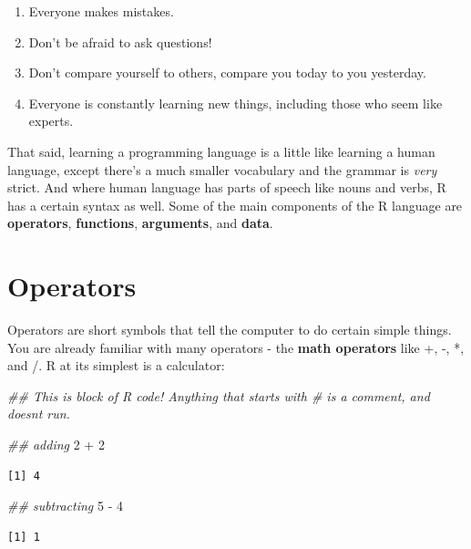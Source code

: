\documentclass[
  letterpaper,
  DIV=11,
  numbers=noendperiod]{scrreprt}
\newenvironment{Shaded}{\begin{snugshade}}{\end{snugshade}}
\newcommand{\DecValTok}[1]{\textcolor[rgb]{0.68,0.00,0.00}{#1}}
\newcommand{\DocumentationTok}[1]{\textcolor[rgb]{0.37,0.37,0.37}{\textit{#1}}}
\newcommand{\SpecialCharTok}[1]{\textcolor[rgb]{0.37,0.37,0.37}{#1}}
\providecommand{\tightlist}{%
  \setlength{\itemsep}{0pt}\setlength{\parskip}{0pt}}\usepackage{longtable,booktabs,array}
\begin{document}
\begin{enumerate}
\def\labelenumi{\arabic{enumi}.}
\tightlist
\item
  Everyone makes mistakes.
\item
  Don't be afraid to ask questions!
\item
  Don't compare yourself to others, compare you today to you yesterday.
\item
  Everyone is constantly learning new things, including those who seem
  like experts.
\end{enumerate}

That said, learning a programming language is a little like learning a
human language, except there's a much smaller vocabulary and the grammar
is \emph{very} strict. And where human language has parts of speech like
nouns and verbs, R has a certain syntax as well. Some of the main
components of the R language are \textbf{operators}, \textbf{functions},
\textbf{arguments}, and \textbf{data}.

\hypertarget{operators}{%
\section{Operators}\label{operators}}

Operators are short symbols that tell the computer to do certain simple
things. You are already familiar with many operators - the \textbf{math
operators} like +, -, *, and /. R at its simplest is a calculator:

\begin{Shaded}
\begin{Highlighting}[]
\DocumentationTok{\#\# This is block of R code! Anything that starts with \# is a comment, and doesn\textquotesingle{}t run.}

\DocumentationTok{\#\# adding}
\DecValTok{2} \SpecialCharTok{+} \DecValTok{2}
\end{Highlighting}
\end{Shaded}

\begin{verbatim}
[1] 4
\end{verbatim}

\begin{Shaded}
\begin{Highlighting}[]
\DocumentationTok{\#\# subtracting}
\DecValTok{5} \SpecialCharTok{{-}} \DecValTok{4}
\end{Highlighting}
\end{Shaded}

\begin{verbatim}
[1] 1
\end{verbatim}
\end{document}
